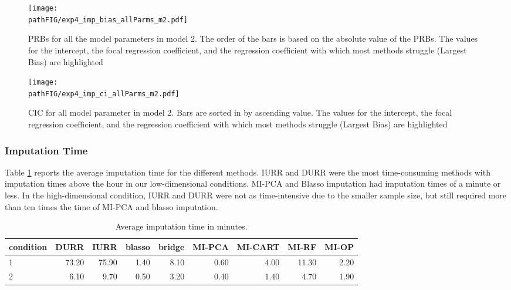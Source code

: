 \begin{figure}
	\centering
	\texttt{[image: \\pathFIG/exp4\_imp\_bias\_allParms\_m2.pdf]}
	\caption{PRBs for all the model parameters in model 2. 
		The order of the bars is based on the absolute value of the PRBs.
		The values for the intercept, the focal regression coefficient, and the regression coefficient with which most 
		methods struggle (Largest Bias) are highlighted}
	\label{fig:exp4_bias_allP}
\end{figure}

\begin{figure}
	\centering
	\texttt{[image: \\pathFIG/exp4\_imp\_ci\_allParms\_m2.pdf]}
	\caption{CIC for all model parameter in model 2.
		Bars are sorted in by ascending value.
		The values for the intercept, the focal regression coefficient, and the regression coefficient with which most 
		methods struggle (Largest Bias) are highlighted}
	\label{fig:exp4_ci_allP}
\end{figure}

\FloatBarrier

\subsubsection{Imputation Time}

	Table \ref{tab:time} reports the average imputation time for the different methods.
	IURR and DURR were the most time-consuming methods with imputation times above the hour 
	in our low-dimensional conditions. 
	MI-PCA and Blasso imputation had imputation times of a minute or less.
	In the high-dimensional condition, IURR and DURR were not as time-intensive due to the smaller
	sample size, but still required more than ten times the time of MI-PCA and blasso imputation.

\begin{table}
	\centering
	\begin{tabular}{l | r | r | r | r | r | r | r | r }
		condition & DURR & IURR & blasso & bridge & MI-PCA & MI-CART & MI-RF & MI-OP \\
		\hline
		1 & 73.20 & 75.90 & 1.40 & 8.10 & 0.60 & 4.00 & 11.30 & 2.20 \\ 
		2 & 6.10 & 9.70 & 0.50 & 3.20 & 0.40 & 1.40 & 4.70 & 1.90 	
	\end{tabular}
	\caption{\label{tab:time}Average imputation time in minutes.}
\end{table}

\FloatBarrier


